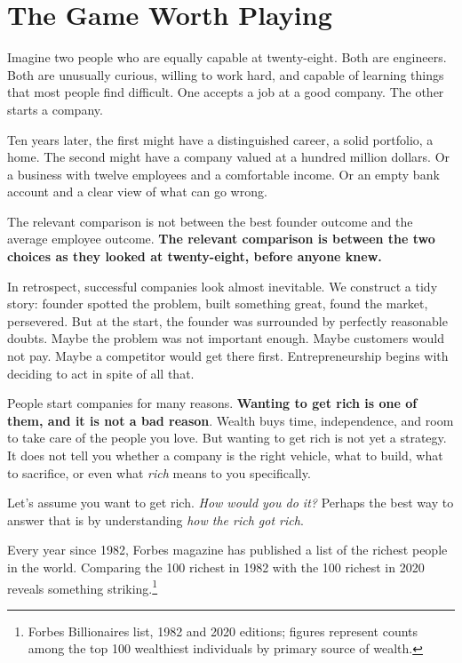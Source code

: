 \chapter{The Game Worth Playing}
\label{ch:source-1}


\bigskip

Imagine two people who are equally capable at twenty-eight. Both are engineers. Both are unusually curious, willing to work hard, and capable of learning things that most people find difficult. One accepts a job at a good company. The other starts a company.

\medskip

Ten years later, the first might have a distinguished career, a solid portfolio, a home. The second might have a company valued at a hundred million dollars. Or a business with twelve employees and a comfortable income. Or an empty bank account and a clear view of what can go wrong.

The relevant comparison is not between the best founder outcome and the average employee outcome. \textbf{The relevant comparison is between the two choices as they looked at twenty-eight, before anyone knew.}

In retrospect, successful companies look almost inevitable. We construct a tidy story: founder spotted the problem, built something great, found the market, persevered. But at the start, the founder was surrounded by perfectly reasonable doubts. Maybe the problem was not important enough. Maybe customers would not pay. Maybe a competitor would get there first. Entrepreneurship begins with deciding to act in spite of all that.

People start companies for many reasons. \textbf{Wanting to get rich is one of them, and it is not a bad reason}. Wealth buys time, independence, and room to take care of the people you love. But wanting to get rich is not yet a strategy. It does not tell you whether a company is the right vehicle, what to build, what to sacrifice, or even what \emph{rich} means to you specifically.

Let's assume you want to get rich. \emph{How would you do it?} Perhaps the best way to answer that is by understanding \emph{how the rich got rich}.

Every year since 1982, Forbes magazine has published a list of the richest people in the world. Comparing the 100 richest in 1982 with the 100 richest in 2020 reveals something striking.\footnote{Forbes Billionaires list, 1982 and 2020 editions; figures represent counts among the top 100 wealthiest individuals by primary source of wealth.}

